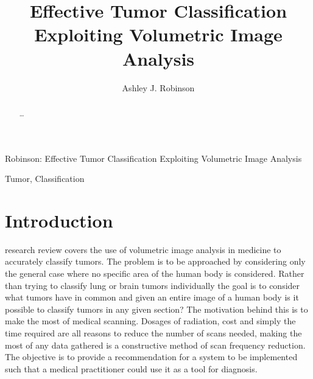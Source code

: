 \documentclass[journal]{IEEEtran}
\begin{document}
\title{Effective Tumor Classification Exploiting Volumetric Image Analysis}
\author{Ashley J. Robinson}

%
{Robinson: Effective Tumor Classification Exploiting Volumetric Image Analysis}

\maketitle


\begin{abstract}

\dots

\end{abstract}







\begin{IEEEkeywords}
Tumor, Classification
\end{IEEEkeywords}



\IEEEpeerreviewmaketitle







\section{Introduction}
 research review covers the use of volumetric image analysis in medicine to accurately classify tumors. 
The problem is to be approached by considering only the general case where no specific area of the human body is considered.
Rather than trying to classify lung or brain tumors individually the goal is to consider what tumors have in common and given an entire image of a human body is it possible to classify tumors in any given section?
The motivation behind this is to make the most of medical scanning.
Dosages of radiation, cost and simply the time required are all reasons to reduce the number of scans needed, making the most of any data gathered is a constructive method of scan frequency reduction.
The objective is to provide a recommendation for a system to be implemented such that a medical practitioner could use it as a tool for diagnosis.  
\end{document}
